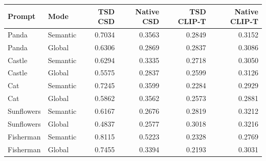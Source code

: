 \begin{tabular}{llrrrr}
\toprule
Prompt & Mode & TSD CSD & Native CSD & TSD CLIP-T & Native CLIP-T \\
\midrule
Panda & Semantic & 0.7034 & 0.3563 & 0.2849 & 0.3152 \\
Panda & Global & 0.6306 & 0.2869 & 0.2837 & 0.3086 \\
Castle & Semantic & 0.6294 & 0.3335 & 0.2718 & 0.3050 \\
Castle & Global & 0.5575 & 0.2837 & 0.2599 & 0.3126 \\
Cat & Semantic & 0.7245 & 0.3599 & 0.2284 & 0.2929 \\
Cat & Global & 0.5862 & 0.3562 & 0.2573 & 0.2881 \\
Sunflowers & Semantic & 0.6167 & 0.2676 & 0.2819 & 0.3212 \\
Sunflowers & Global & 0.4837 & 0.2577 & 0.3018 & 0.3216 \\
Fisherman & Semantic & 0.8115 & 0.5223 & 0.2328 & 0.2769 \\
Fisherman & Global & 0.7455 & 0.3394 & 0.2193 & 0.3031 \\
\bottomrule
\end{tabular}
